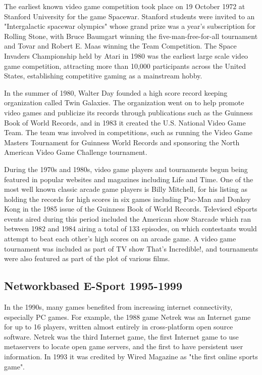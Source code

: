 		The earliest known video game competition took place on 19 October 1972 at Stanford University for the game Spacewar. Stanford students were invited to an "Intergalactic spacewar olympics" whose grand prize was a year's subscription for Rolling Stone, with Bruce Baumgart winning the five-man-free-for-all tournament and Tovar and Robert E. Maas winning the Team Competition. The Space Invaders Championship held by Atari in 1980 was the earliest large scale video game competition, attracting more than 10,000 participants across the United States, establishing competitive gaming as a mainstream hobby.
		
		In the summer of 1980, Walter Day founded a high score record keeping organization called Twin Galaxies. The organization went on to help promote video games and publicize its records through publications such as the Guinness Book of World Records, and in 1983 it created the U.S. National Video Game Team. The team was involved in competitions, such as running the Video Game Masters Tournament for Guinness World Records and sponsoring the North American Video Game Challenge tournament.
		
		During the 1970s and 1980s, video game players and tournaments begun being featured in popular websites and magazines including Life and Time. One of the most well known classic arcade game players is Billy Mitchell, for his listing as holding the records for high scores in six games including Pac-Man and Donkey Kong in the 1985 issue of the Guinness Book of World Records. Televised eSports events aired during this period included the American show Starcade which ran between 1982 and 1984 airing a total of 133 episodes, on which contestants would attempt to beat each other's high scores on an arcade game. A video game tournament was included as part of TV show That's Incredible!, and tournaments were also featured as part of the plot of various films.
		\newpage
	\subsection{Networkbased E-Sport 1995-1999}
	
		In the 1990s, many games benefited from increasing internet connectivity, especially PC games. For example, the 1988 game Netrek was an Internet game for up to 16 players, written almost entirely in cross-platform open source software. Netrek was the third Internet game, the first Internet game to use metaservers to locate open game servers, and the first to have persistent user information. In 1993 it was credited by Wired Magazine as "the first online sports game".
		
